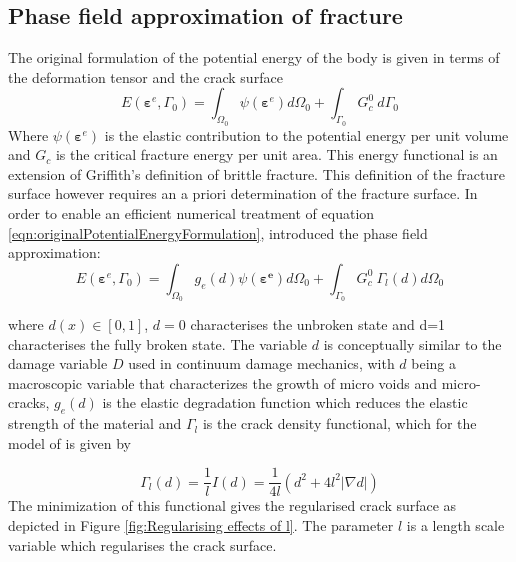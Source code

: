 \documentclass[sn-mathphys,Numbered,draft]{sn-jnl}%
\begin{document}
\subsection{Phase field approximation of fracture}

The original formulation of the potential energy of the body \cite{mumford_optimal_1989} is given in terms of the deformation tensor and the crack surface
\begin{equation}
\label{eqn:originalPotentialEnergyFormulation}
	E\left(\boldsymbol{\varepsilon}^e,\Gamma_0\right)=\int_{\Omega_0}{\psi\left(\boldsymbol{\varepsilon}^e\right)d\Omega_0}+\int_{\Gamma_0}{G_c^0\ d\Gamma_0}
\end{equation}
Where $\psi\left(\boldsymbol{\varepsilon}^e\right)$ is the elastic contribution to the potential energy per unit volume and $G_c$ is the critical fracture energy per unit area. This energy functional is an extension of Griffith’s definition of brittle fracture. This definition of the fracture surface however requires an a priori determination of the fracture surface. In order to enable an efficient numerical treatment of equation \ref{eqn:originalPotentialEnergyFormulation}, \citet{bourdin_time-discrete_2011} introduced the phase field approximation: 
\begin{equation}
	E\left(\boldsymbol{\varepsilon}^e,\Gamma_0\right)=\int_{\Omega_0}{g_e(d)\psi\left(\boldsymbol{\varepsilon^e}\right)d\Omega_0}+\int_{\Gamma_0}{G_c^0\ \Gamma_l\left(d\right)d\Omega_0}
\end{equation}

where $d\left(x\right)\in\left[0,1\right]$,  $d=0$ characterises the unbroken state and d=1 characterises the fully broken state. The variable $d$ is conceptually similar to the damage variable $D$ used in continuum damage mechanics, with $d$ being a macroscopic variable that characterizes the growth of micro voids and micro-cracks, $g_e(d)$ is the elastic degradation function which reduces the elastic strength of the material and $\Gamma_l$ is the crack density functional, which for the model of \citet{borden_phase-field_2016} is given by

\begin{equation}
	\Gamma_l\left(d\right)=\frac{1}{l}I\left(d\right)=\frac{1}{4l}\left(d^2+4l^2|\nabla d|\right)
\end{equation}
The minimization of this functional gives the regularised crack surface as depicted in Figure \ref{fig:Regularising effects of l}. The parameter $l$ is a length scale variable which regularises the crack surface.
\end{document}
